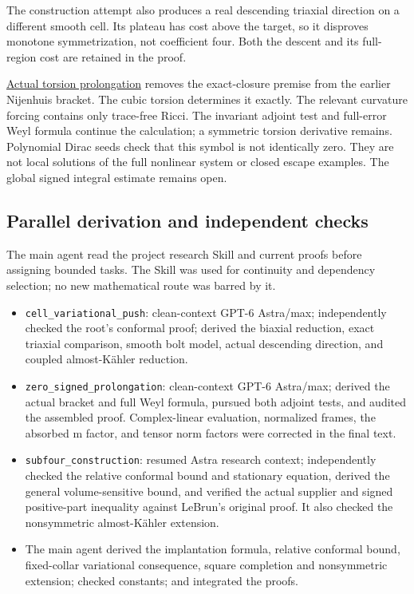 \documentclass[
  10pt,
]{article}
\providecommand{\tightlist}{%
  \setlength{\itemsep}{0pt}\setlength{\parskip}{0pt}}
\begin{document}
The construction attempt also produces a real descending triaxial
direction on a different smooth cell. Its plateau has cost above the
target, so it disproves monotone symmetrization, not coefficient four.
Both the descent and its full-region cost are retained in the proof.

\href{../continuation/20260928_actual_torsion_prolongation.md}{Actual
torsion prolongation} removes the exact-closure premise from the earlier
Nijenhuis bracket. The cubic torsion determines it exactly. The relevant
curvature forcing contains only trace-free Ricci. The invariant adjoint
test and full-error Weyl formula continue the calculation; a symmetric
torsion derivative remains. Polynomial Dirac seeds check that this
symbol is not identically zero. They are not local solutions of the full
nonlinear system or closed escape examples. The global signed integral
estimate remains open.

\hypertarget{parallel-derivation-and-independent-checks-1}{%
\subsection{Parallel derivation and independent
checks}\label{parallel-derivation-and-independent-checks-1}}

The main agent read the project research Skill and current proofs before
assigning bounded tasks. The Skill was used for continuity and
dependency selection; no new mathematical route was barred by it.

\begin{itemize}
\tightlist
\item
  \nolinkurl{cell_variational_push}: clean-context GPT-6 Astra/max;
  independently checked the root's conformal proof; derived the biaxial
  reduction, exact triaxial comparison, smooth bolt model, actual
  descending direction, and coupled almost-Kähler reduction.
\item
  \nolinkurl{zero_signed_prolongation}: clean-context GPT-6 Astra/max;
  derived the actual bracket and full Weyl formula, pursued both adjoint
  tests, and audited the assembled proof. Complex-linear evaluation,
  normalized frames, the absorbed m factor, and tensor norm factors were
  corrected in the final text.
\item
  \nolinkurl{subfour_construction}: resumed Astra research context;
  independently checked the relative conformal bound and stationary
  equation, derived the general volume-sensitive bound, and verified the
  actual supplier and signed positive-part inequality against LeBrun's
  original proof. It also checked the nonsymmetric almost-Kähler
  extension.
\item
  The main agent derived the implantation formula, relative conformal
  bound, fixed-collar variational consequence, square completion and
  nonsymmetric extension; checked constants; and integrated the proofs.
\end{itemize}
\end{document}
